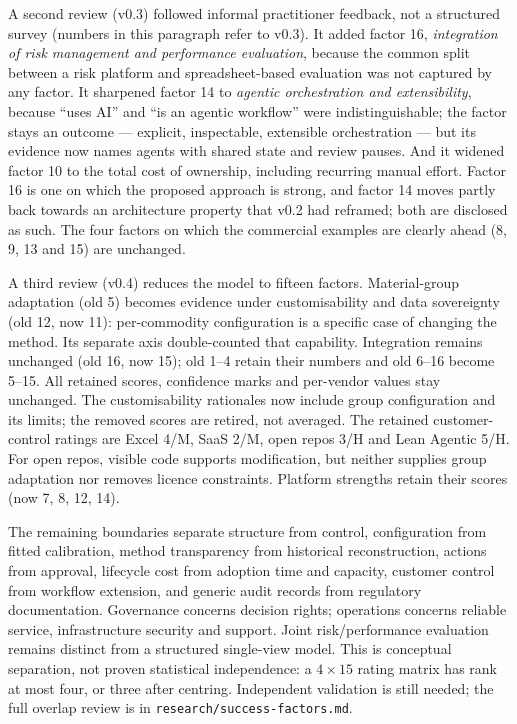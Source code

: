 \documentclass[10pt,twocolumn,a4paper]{article}
\newcommand{\code}[1]{{\small\texttt{#1}}}
\begin{document}
A second review (v0.3) followed informal practitioner feedback, not a structured survey
(numbers in this paragraph refer to v0.3). It added factor 16,
\emph{integration of risk management and performance evaluation}, because the common
split between a risk platform and spreadsheet-based evaluation was not captured by any
factor. It sharpened factor 14 to \emph{agentic orchestration and extensibility}, because
``uses AI'' and ``is an agentic workflow'' were indistinguishable; the factor stays an
outcome --- explicit, inspectable, extensible orchestration --- but its evidence now names
agents with shared state and review pauses. And it widened factor 10 to the total cost of
ownership, including recurring manual effort. Factor 16 is one on which the proposed
approach is strong, and factor 14 moves partly back towards an architecture property
that v0.2 had reframed; both are disclosed as such. The four factors on which the
commercial examples are clearly ahead (8, 9, 13 and 15) are unchanged.

A third review (v0.4) reduces the model to fifteen factors. Material-group adaptation
(old 5) becomes evidence under customisability and data sovereignty (old 12, now 11):
per-commodity configuration is a specific case of changing the method. Its separate axis
double-counted that capability. Integration remains unchanged (old 16, now 15); old 1--4
retain their numbers and old 6--16 become 5--15. All retained scores, confidence marks and
per-vendor values stay unchanged. The customisability rationales now include group
configuration and its limits; the removed scores are retired, not averaged. The retained
customer-control ratings are Excel 4/M, SaaS 2/M, open repos 3/H and Lean Agentic 5/H.
For open repos, visible code supports modification, but neither supplies group adaptation
nor removes licence constraints. Platform strengths retain their scores (now 7, 8, 12, 14).

The remaining boundaries separate structure from control, configuration from fitted
calibration, method transparency from historical reconstruction, actions from approval,
lifecycle cost from adoption time and capacity, customer control from workflow extension,
and generic audit records from regulatory documentation. Governance concerns decision
rights; operations concerns reliable service, infrastructure security and support. Joint
risk/performance evaluation remains distinct from a structured single-view model. This is
conceptual separation, not proven statistical independence: a $4\times15$ rating matrix
has rank at most four, or three after centring. Independent validation is still needed;
the full overlap review is in \code{research/success-factors.md}.
\end{document}
